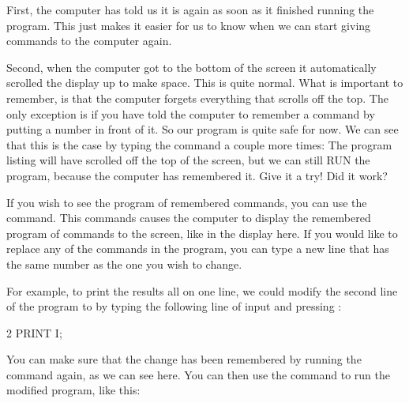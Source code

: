   First, the computer has told us it is  again
  as soon as it finished running the program. This just makes it easier for us to know when we
  can start giving commands to the computer again.

  Second, when the computer got to the bottom of the screen
  it automatically scrolled the display up to make space.  This is quite normal.  What is important
  to remember, is that the computer forgets everything that scrolls off the top.  The only exception
  is if you have told the computer to remember a command by putting a number in front of it.  So
  our program is quite safe for now. We can see that this is the case by typing the  command a
  couple more times: The program listing will have scrolled off the top of the screen, but we can
  still RUN the program, because the computer has remembered it.  Give it a try!
  Did it work?

\needspace{4cm} %
  If you wish to see the program of remembered commands, you can use the 
  command.  This commands causes the computer to display the remembered program of commands to the screen, like in the display here.
  If you would like to replace any of the commands in the program, you can type a new line that has the same number as the one you
  wish to change.


\needspace{4cm} %
  For example, to print the results all on one line, we could modify the second line of the program to  by
  typing the following line of input and pressing :



\begin{screencode}
2 PRINT I;
\end{screencode}


\needspace{4cm} %

You can make sure that the change has been remembered by running the  command again, as we can see here.
You can then use the  command to run the modified
program, like this:

